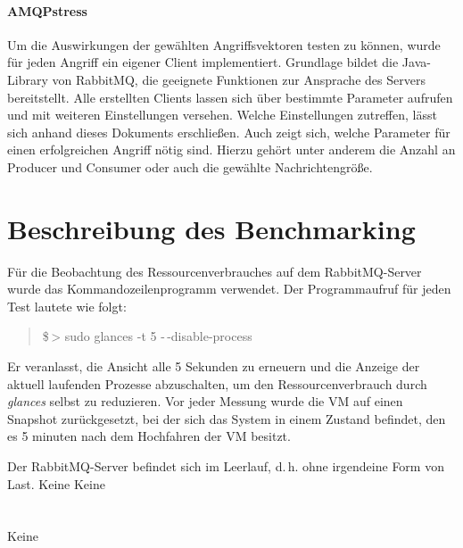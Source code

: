 \documentclass[	a4paper,
			11pt,
			titlepage,
			oneside,
			fleqn,
			listof=totoc,
			parskip,
			numbers=noenddot]{scrartcl}
\begin{document}
	
	\paragraph{AMQPstress} Um die Auswirkungen der gewählten Angriffsvektoren testen zu können, wurde für jeden Angriff ein eigener Client implementiert. Grundlage bildet die Java-Library von RabbitMQ, die geeignete Funktionen zur Ansprache des Servers bereitstellt. Alle erstellten Clients lassen sich über bestimmte Parameter aufrufen und mit weiteren Einstellungen versehen. Welche Einstellungen zutreffen, lässt sich anhand dieses Dokuments erschließen. Auch zeigt sich, welche Parameter für einen erfolgreichen Angriff nötig sind. Hierzu gehört unter anderem die Anzahl an Producer und Consumer oder auch die gewählte Nachrichtengröße.
	
\clearpage
\section*{Beschreibung des Benchmarking}
	
	Für die Beobachtung des Ressourcenverbrauches auf dem RabbitMQ-Server wurde das Kommandozeilenprogramm  verwendet. Der Programmaufruf für jeden Test lautete wie folgt:
	\begin{quote}
		\ttfamily
		\$\,> sudo glances -t 5 -\,-disable-process
	\end{quote}
	Er veranlasst, die Ansicht alle 5 Sekunden zu erneuern und die Anzeige der aktuell laufenden Prozesse abzuschalten, um den Ressourcenverbrauch durch \textsl{glances} selbst zu reduzieren.
	Vor jeder Messung wurde die VM auf einen Snapshot zurückgesetzt, bei der sich das System in einem Zustand befindet, den es 5 minuten nach dem Hochfahren der VM besitzt.
	
		{Der RabbitMQ-Server befindet sich im Leerlauf, d.\,h. ohne irgendeine Form von Last.}%
		{Keine}%
		{Keine}%
		{%
		 \\
		 \\
		 \\
		}%
		{Keine}
	
\end{document}
